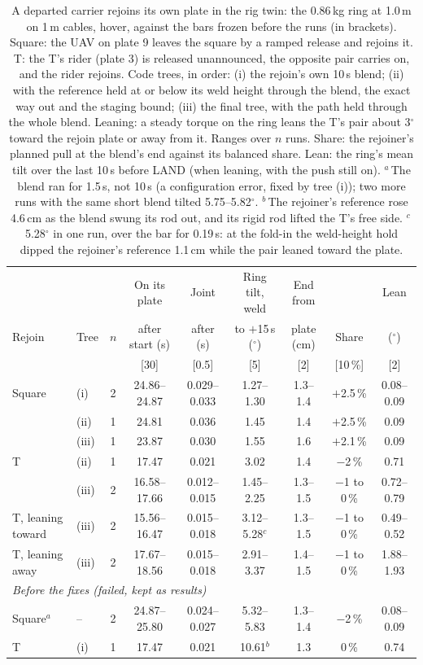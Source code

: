 \begin{table}[htbp]
\centering
\footnotesize
\setlength{\tabcolsep}{2.4pt}
\caption[A departed carrier rejoins]{A departed carrier rejoins its own plate in the rig twin: the 0.86\,kg ring at
1.0\,m on 1\,m cables, hover, against the bars frozen before the runs (in brackets). Square: the UAV on plate 9 leaves
the square by a ramped release and rejoins it. T: the T's rider (plate 3) is released unannounced, the opposite pair
carries on, and the rider rejoins. Code trees, in order: (i) the rejoin's own 10\,s blend; (ii) with the reference
held at or below its weld height through the blend, the exact way out and the staging bound; (iii) the final tree, with
the path held through the whole blend. Leaning: a steady torque on the ring leans the T's pair about 3$^\circ$ toward
the rejoin plate or away from it. Ranges over $n$ runs. Share: the rejoiner's planned pull at the blend's end against
its balanced share. Lean: the ring's mean tilt over the last 10\,s before LAND (when leaning, with the push still on).
$^a$\,The blend ran for 1.5\,s, not 10\,s (a configuration error, fixed by tree (i)); two more runs with the same short
blend tilted 5.75--5.82$^\circ$. $^b$\,The rejoiner's reference rose 4.6\,cm as the blend swung its rod out, and its
rigid rod lifted the T's free side. $^c$\,5.28$^\circ$ in one run, over the bar for 0.19\,s: at the fold-in the weld-height hold
dipped the rejoiner's reference 1.1\,cm while the pair leaned toward the plate.}
\label{tab:rejoin}
\begin{tabular}{llccccccc}
\toprule
 & & & On its plate & Joint & Ring tilt, weld & End from & & Lean \\
Rejoin & Tree & $n$ & after start (s) & after (s) & to $+$15\,s ($^\circ$) & plate (cm) & Share & ($^\circ$) \\
 & & & [30] & [0.5] & [5] & [2] & [10\,\%] & [2] \\
\midrule
Square & (i) & 2 & 24.86--24.87 & 0.029--0.033 & 1.27--1.30 & 1.3--1.4 & $+$2.5\,\% & 0.08--0.09 \\
 & (ii) & 1 & 24.81 & 0.036 & 1.45 & 1.4 & $+$2.5\,\% & 0.09 \\
 & (iii) & 1 & 23.87 & 0.030 & 1.55 & 1.6 & $+$2.1\,\% & 0.09 \\
T & (ii) & 1 & 17.47 & 0.021 & 3.02 & 1.4 & $-$2\,\% & 0.71 \\
 & (iii) & 2 & 16.58--17.66 & 0.012--0.015 & 1.45--2.25 & 1.3--1.5 & $-$1 to 0\,\% & 0.72--0.79 \\
T, leaning toward & (iii) & 2 & 15.56--16.47 & 0.015--0.018 & 3.12--5.28$^c$ & 1.3--1.5 & $-$1 to 0\,\% & 0.49--0.52 \\
T, leaning away & (iii) & 2 & 17.67--18.56 & 0.015--0.018 & 2.91--3.37 & 1.4--1.5 & $-$1 to 0\,\% & 1.88--1.93 \\
\midrule
\multicolumn{9}{l}{\emph{Before the fixes (failed, kept as results)}} \\
Square$^a$ & -- & 2 & 24.87--25.80 & 0.024--0.027 & 5.32--5.83 & 1.3--1.4 & $-$2\,\% & 0.08--0.09 \\
T & (i) & 1 & 17.47 & 0.021 & 10.61$^b$ & 1.3 & 0\,\% & 0.74 \\
\bottomrule
\end{tabular}
\end{table}
